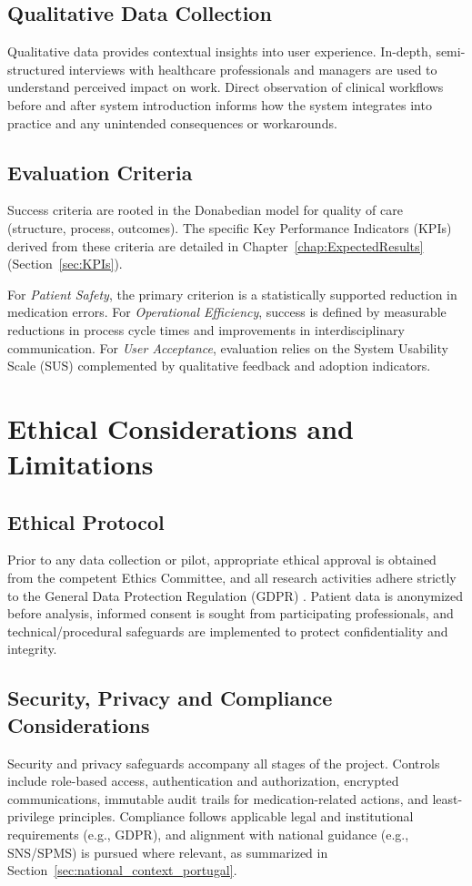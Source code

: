 \subsection{Qualitative Data Collection}
Qualitative data provides contextual insights into user experience. In-depth, semi-structured interviews with healthcare professionals and managers are used to understand perceived impact on work. Direct observation of clinical workflows before and after system introduction informs how the system integrates into practice and any unintended consequences or workarounds.

\subsection{Evaluation Criteria}
Success criteria are rooted in the Donabedian model for quality of care (structure, process, outcomes). The specific Key Performance Indicators (KPIs) derived from these criteria are detailed in Chapter~\ref{chap:ExpectedResults} (Section~\ref{sec:KPIs}).

For \textit{Patient Safety}, the primary criterion is a statistically supported reduction in medication errors. For \textit{Operational Efficiency}, success is defined by measurable reductions in process cycle times and improvements in interdisciplinary communication. For \textit{User Acceptance}, evaluation relies on the System Usability Scale (SUS) complemented by qualitative feedback and adoption indicators.

\section{Ethical Considerations and Limitations}

\subsection{Ethical Protocol}
Prior to any data collection or pilot, appropriate ethical approval is obtained from the competent Ethics Committee, and all research activities adhere strictly to the General Data Protection Regulation (GDPR) \cite{european2016}. Patient data is anonymized before analysis, informed consent is sought from participating professionals, and technical/procedural safeguards are implemented to protect confidentiality and integrity.

\subsection{Security, Privacy and Compliance Considerations}
Security and privacy safeguards accompany all stages of the project. Controls include role-based access, authentication and authorization, encrypted communications, immutable audit trails for medication-related actions, and least-privilege principles. Compliance follows applicable legal and institutional requirements (e.g., GDPR), and alignment with national guidance (e.g., SNS/SPMS) is pursued where relevant, as summarized in Section~\ref{sec:national_context_portugal}.

